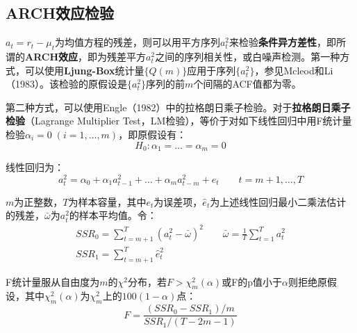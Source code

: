 \documentclass[11pt]{article}
\begin{document}

\subsection{ARCH效应检验}

$a_t = r_t - \mu_t$为均值方程的残差，则可以用平方序列$a_t^2$来检验\textbf{条件异方差性}，即所谓的\textbf{ARCH效应}，即为残差平方$a_t^2$之间的序列相关性，或白噪声检测。第一种方式，可以使用\textbf{Ljung-Box}统计量$\{Q(m)\}$应用于序列$\{a_t^2\}$，参见Mcleod和Li（1983）。该检验的原假设是$\{a_t^2\}$序列的前$m$个间隔的ACF值都为零。

第二种方式，可以使用Engle（1982）中的拉格朗日乘子检验。对于\textbf{拉格朗日乘子检验}（Lagrange Multiplier Test，LM检验），等价于对如下线性回归中用F统计量检验$\alpha_i=0\;(i=1,\dots,m)$，即原假设有：
\begin{equation*}
    H_0: \alpha_1 = \dots = \alpha_m = 0
\end{equation*}

线性回归为：
\begin{equation*}
    a^2_t = \alpha_0 + \alpha_1 a^{2}_{t-1} + \dots + \alpha_m a^{2}_{t-m} + e_t \qquad t=m+1,\dots,T
\end{equation*}

$m$为正整数，$T$为样本容量，其中$e_t$为误差项，$\hat{e}_t$为上述线性回归最小二乘法估计的残差，$\bar{\omega}$为$a_t^2$的样本平均值。令：
\begin{gather*}
    SSR_0 = \sum_{t=m+1}^{T} (a_t^2 - \bar{\omega})^2 \qquad
    \bar{\omega} = \frac{1}{T} \sum_{t=1}^{T} a_t^2 \\
    SSR_1 = \sum_{t=m+1}^{T} \hat{e}_t^2
\end{gather*}

F统计量服从自由度为$m$的$\chi^2$分布，若$F>\chi_m^2(\alpha)$或F的p值小于$\alpha$则拒绝原假设，其中$\chi_m^2(\alpha)$为$\chi_m^2$上的$100(1-\alpha)$点：
\begin{equation*}
    F = \frac{(SSR_0-SSR_1)/m}{SSR_1/(T-2m-1)}
\end{equation*}
\end{document}
